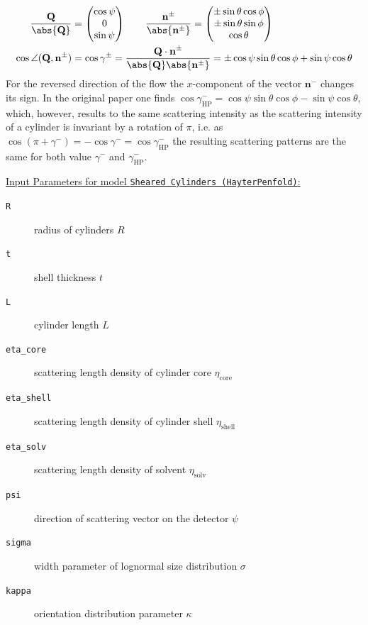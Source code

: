 \begin{align}
\frac{\mathbf{Q}}{\abs{\mathbf{Q}}} &=
\begin{pmatrix}
\cos \psi \\
0  \\
\sin \psi
\end{pmatrix} \qquad
\frac{\mathbf{n}^\pm}{\abs{\mathbf{n}^\pm}} =
\begin{pmatrix}
\pm \sin \theta \cos \phi \\
\pm \sin \theta \sin \phi  \\
\cos \theta
\end{pmatrix} \\
\cos \angle(\mathbf{Q,n}^\pm) &= \cos \gamma^\pm = \frac{\mathbf{Q\cdot n}^\pm}{\abs{\mathbf{Q}}\abs{\mathbf{n}^\pm}} =  \pm \cos\psi \sin\theta \cos\phi + \sin\psi \cos\theta
\end{align}
For the reversed direction of the flow the $x$-component of the vector $\mathbf{n}^-$ changes its sign. In the original paper \cite{Hayter1984} one finds $\cos \gamma^-_\mathrm{HP} = \cos\psi \sin\theta \cos\phi - \sin\psi \cos\theta$, which, however, results to the same scattering intensity as the scattering intensity of a cylinder is invariant by a rotation of $\pi$, i.e. as $\cos(\pi+\gamma^-) =-\cos\gamma^- = \cos\gamma^-_\mathrm{HP}$ the resulting scattering patterns are the same for both value $\gamma^-$ and $\gamma^-_\mathrm{HP}$.

\vspace{5mm}

\underline{Input Parameters for model \texttt{Sheared Cylinders (HayterPenfold)}:}\\
\begin{description}
\item[\texttt{R}] radius of cylinders $R$
\item[\texttt{t}] shell thickness $t$
\item[\texttt{L}] cylinder length $L$
\item[\texttt{eta\_core}] scattering length density of cylinder core $\eta_\mathrm{core}$
\item[\texttt{eta\_shell}] scattering length density of cylinder shell $\eta_\mathrm{shell}$
\item[\texttt{eta\_solv}] scattering length density of solvent $\eta_\mathrm{solv}$
\item[\texttt{psi}] direction of scattering vector on the detector $\psi$
\item[{\texttt{sigma}}] width parameter of lognormal size distribution $\sigma$
\item[{\texttt{kappa}}] orientation distribution parameter $\kappa$
\end{description}

